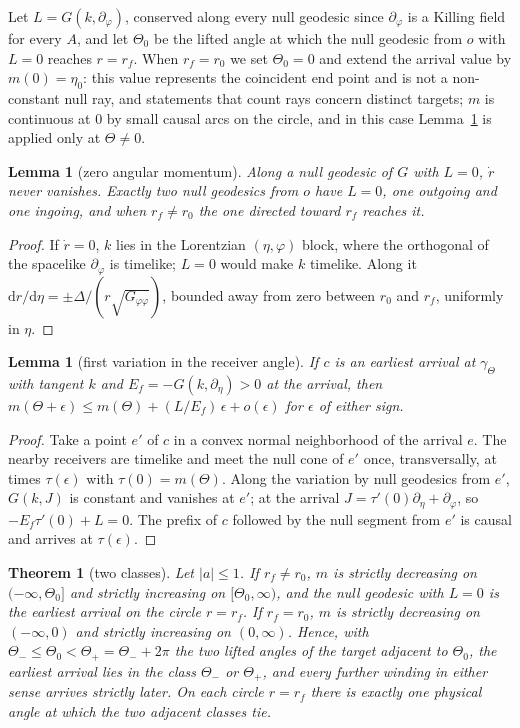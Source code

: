 \documentclass[aip,jmp,amsmath,amssymb,reprint]{revtex4-2}
\newcommand{\dd}{\mathrm{d}}
\theoremstyle{plain}
\newtheorem{theorem}{Theorem}
\newtheorem{lemma}[proposition]{Lemma}
\theoremstyle{definition}
\begin{document}
Let $L=G(k,\partial_\varphi)$, conserved along every null geodesic since $\partial_\varphi$ is a Killing field for
every $A$, and let $\Theta_0$ be the lifted angle at which the null geodesic from $o$ with $L=0$ reaches
$r=r_f$. When $r_f=r_0$ we set $\Theta_0=0$ and extend the arrival value by $m(0)=\eta_0$: this value
represents the coincident end point and is not a non-constant null ray, and statements that
count rays concern distinct targets; $m$ is continuous at $0$ by small causal arcs on the circle,
and in this case Lemma~\ref{lem:kerr-V} is applied only at $\Theta\ne0$.

\begin{lemma}[zero angular momentum]\label{lem:kerr-Z}
Along a null geodesic of $G$ with $L=0$, $\dot r$ never vanishes. Exactly two null geodesics from $o$
have $L=0$, one outgoing and one ingoing, and when $r_f\ne r_0$ the one directed toward $r_f$ reaches
it.
\end{lemma}

\begin{proof}
If $\dot r=0$, $k$ lies in the Lorentzian $(\eta,\varphi)$ block, where the orthogonal of the spacelike
$\partial_\varphi$ is timelike; $L=0$ would make $k$ timelike. Along it
$\dd r/\dd\eta=\pm\Delta/(r\sqrt{G_{\varphi\varphi}})$, bounded away from zero between $r_0$ and $r_f$, uniformly in $\eta$.
\end{proof}

\begin{lemma}[first variation in the receiver angle]\label{lem:kerr-V}
If $c$ is an earliest arrival at $\gamma_{\Theta}$ with tangent $k$ and $E_f=-G(k,\partial_\eta)>0$ at the arrival, then
$m(\Theta+\epsilon)\le m(\Theta)+(L/E_f)\,\epsilon+o(\epsilon)$ for $\epsilon$ of either sign.
\end{lemma}

\begin{proof}
Take a point $e'$ of $c$ in a convex normal neighborhood of the arrival $e$. The nearby receivers
are timelike and meet the null cone of $e'$ once, transversally, at times $\tau(\epsilon)$ with
$\tau(0)=m(\Theta)$. Along the variation by null geodesics from $e'$, $G(k,J)$ is constant and vanishes at $e'$;
at the arrival $J=\tau'(0)\partial_\eta+\partial_\varphi$, so $-E_f\tau'(0)+L=0$. The prefix of $c$ followed by the null
segment from $e'$ is causal and arrives at $\tau(\epsilon)$.
\end{proof}

\begin{theorem}[two classes]\label{thm:kerr-W}
Let $|a|\le1$. If $r_f\ne r_0$, $m$ is strictly decreasing on $(-\infty,\Theta_0]$ and strictly increasing on
$[\Theta_0,\infty)$, and the null geodesic with $L=0$ is the earliest arrival on the circle $r=r_f$. If
$r_f=r_0$, $m$ is strictly decreasing on $(-\infty,0)$ and strictly increasing on $(0,\infty)$. Hence, with
$\Theta_-\le\Theta_0<\Theta_+=\Theta_-+2\pi$ the two lifted angles of the target adjacent to $\Theta_0$, the earliest arrival
lies in the class $\Theta_-$ or $\Theta_+$, and every further winding in either sense arrives strictly
later. On each circle $r=r_f$ there is exactly one physical angle at which the two adjacent classes
tie.
\end{theorem}
\end{document}
